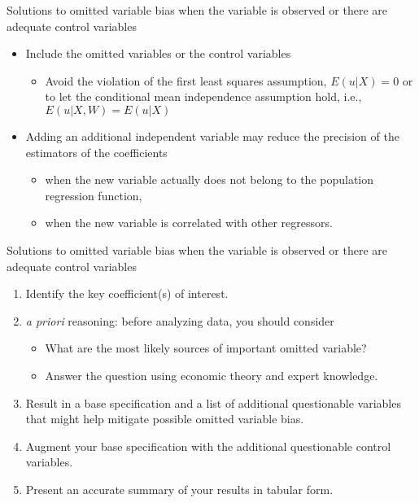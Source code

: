 \documentclass[presentation,10pt]{beamer}
\begin{document}
\begin{frame}[label={sec:org6303ef6}]{Solutions to omitted variable bias when the variable is observed or there are adequate control variables}
\begin{itemize}
\item Include the omitted variables or the control variables
\begin{itemize}
\item Avoid the violation of the first least squares assumption, \(E(u |
    X ) = 0\) or to let the conditional mean independence assumption
hold, i.e., \(E(u|X, W) = E(u|X)\)
\end{itemize}
\end{itemize}

\vspace{0.2cm} 

\begin{itemize}
\item Adding an additional independent variable may reduce the precision of the
estimators of the coefficients 
\begin{itemize}
\item when the new variable actually does not belong to the population
regression function,
\item when the new variable is correlated with other regressors.
\end{itemize}
\end{itemize}
\end{frame}

\begin{frame}[label={sec:orgf02618b}]{Solutions to omitted variable bias when the variable is observed or there are adequate control variables}
\begin{enumerate}
\item Identify the key coefficient(s) of interest.

\item \emph{a priori} reasoning: before analyzing data, you should consider
\begin{itemize}
\item What are the most likely sources of important omitted variable?
\item Answer the question using economic theory and expert knowledge.
\end{itemize}

\item Result in a base specification and a list of additional
questionable variables that might help mitigate possible omitted
variable bias.

\item Augment your base specification with the additional questionable
control variables.

\item Present an accurate summary of your results in tabular form.
\end{enumerate}
\end{frame}
\end{document}
